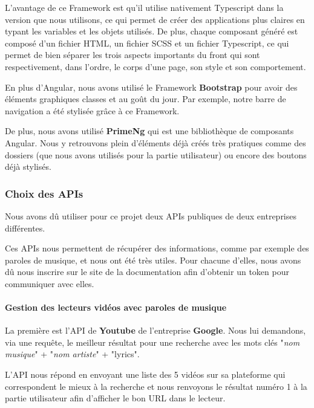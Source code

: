 \documentclass[12pt,french]{article}
\begin{document}
L'avantage de ce Framework est qu'il utilise nativement Typescript dans la version que nous utilisons, ce qui permet de créer des applications plus claires en typant les variables et les objets utilisés. De plus, chaque composant généré est composé d'un fichier HTML, un fichier SCSS et un fichier Typescript, ce qui permet de bien séparer les trois aspects importants du front qui sont respectivement, dans l'ordre, le corps d'une page, son style et son comportement.

\bigskip

En plus d'Angular, nous avons utilisé le Framework \textbf{Bootstrap} pour avoir des éléments graphiques classes et au goût du jour. Par exemple, notre barre de navigation a été stylisée grâce à ce Framework.

De plus, nous avons utilisé \textbf{PrimeNg} qui est une bibliothèque de composants Angular. Nous y retrouvons plein d'éléments déjà créés très pratiques comme des dossiers (que nous avons utilisés pour la partie utilisateur) ou encore des boutons déjà stylisés.


\subsubsection{Choix des APIs}

Nous avons dû utiliser pour ce projet deux APIs publiques de deux entreprises différentes.

\medskip

Ces APIs nous permettent de récupérer des informations, comme par exemple des paroles de musique, et nous ont été très utiles. Pour chacune d'elles, nous avons dû nous inscrire sur le site de la documentation afin d'obtenir un token pour communiquer avec elles.

\paragraph{Gestion des lecteurs vidéos avec paroles de musique \\}

La première est l'API de \textbf{Youtube} de l'entreprise \textbf{Google}. Nous lui demandons, via une requête, le meilleur résultat pour une recherche avec les mots clés "\textit{nom musique}" + "\textit{nom artiste}" + "lyrics".

L'API nous répond en envoyant une liste des 5 vidéos sur sa plateforme qui correspondent le mieux à la recherche et nous renvoyons le résultat numéro 1 à la partie utilisateur afin d'afficher le bon URL dans le lecteur.
\end{document}
